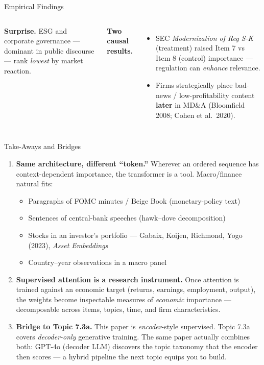 \begin{frame}{Empirical Findings}
\begin{columns}[T]
\smallskip
\begin{tcolorbox}[colback=LightGray, colframe=RedTitle, boxrule=0.3mm, arc=1mm, left=2mm, right=2mm, top=0.8mm, bottom=0.8mm]
\textbf{Surprise.} ESG and corporate governance --- dominant in public discourse --- rank \emph{lowest} by market reaction.
\end{tcolorbox}

\smallskip
\textbf{Two causal results.}
\begin{itemize}
\item SEC \emph{Modernization of Reg S-K} (treatment) raised Item 7 vs Item 8 (control) importance --- regulation can \emph{enhance} relevance.
\item Firms strategically place bad-news / low-profitability content \textbf{later} in MD\&A (Bloomfield 2008; Cohen et al.\ 2020).
\end{itemize}
\end{columns}
\end{frame}

\begin{frame}{Take-Aways and Bridges}
\begin{enumerate}
\item \textbf{Same architecture, different ``token.''} Wherever an ordered sequence has context-dependent importance, the transformer is a tool. Macro/finance natural fits:
\begin{itemize}
    \item Paragraphs of FOMC minutes / Beige Book (monetary-policy text)
    \item Sentences of central-bank speeches (hawk--dove decomposition)
    \item Stocks in an investor's portfolio --- Gabaix, Koijen, Richmond, Yogo (2023), \emph{Asset Embeddings}
    \item Country--year observations in a macro panel
\end{itemize}

\medskip
\item \textbf{Supervised attention is a research instrument.} Once attention is trained against an economic target (returns, earnings, employment, output), the weights become inspectable measures of \emph{economic} importance --- decomposable across items, topics, time, and firm characteristics.

\medskip
\item \textbf{Bridge to Topic 7.3a.} This paper is \emph{encoder}-style supervised. Topic 7.3a covers \emph{decoder-only} generative training. The same paper actually combines both: GPT-4o (decoder LLM) discovers the topic taxonomy that the encoder then scores --- a hybrid pipeline the next topic equips you to build.
\end{enumerate}
\end{frame}


